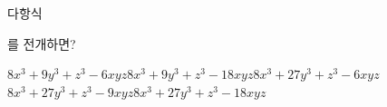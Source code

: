 다항식\par\smallskip{}\par\smallskip\noindent 를 전개하면?
\begin{choicesii}{$8x^3+9y^3+z^3-6xyz$}{$8x^3+9y^3+z^3-18xyz$}{$8x^3+27y^3+z^3-6xyz$}{$8x^3+27y^3+z^3-9xyz$}{$8x^3+27y^3+z^3-18xyz$}\end{choicesii}
